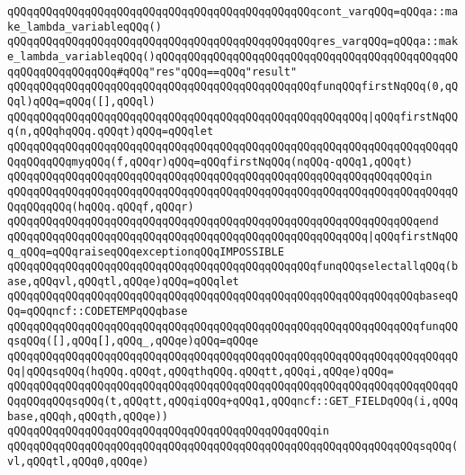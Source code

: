 \verb|qQQqqQQqqQQqqQQqqQQqqQQqqQQqqQQqqQQqqQQqqQQqqQQqcont_varqQQq=qQQqa::make_lambda_variableqQQq()|\newline
\verb|qQQqqQQqqQQqqQQqqQQqqQQqqQQqqQQqqQQqqQQqqQQqqQQqres_varqQQq=qQQqa::make_lambda_variableqQQq()qQQqqQQqqQQqqQQqqQQqqQQqqQQqqQQqqQQqqQQqqQQqqQQqqQQqqQQqqQQqqQQq#qQQq"res"qQQq==qQQq"result"|\newline
\newline
\verb|qQQqqQQqqQQqqQQqqQQqqQQqqQQqqQQqqQQqqQQqqQQqqQQqfunqQQqfirstNqQQq(0,qQQql)qQQq=qQQq([],qQQql)|\newline
\verb|qQQqqQQqqQQqqQQqqQQqqQQqqQQqqQQqqQQqqQQqqQQqqQQqqQQqqQQq|\verb#|qQQqfirstNqQQq(n,qQQqhqQQq.qQQqt)qQQq=qQQqlet#\newline
\verb|qQQqqQQqqQQqqQQqqQQqqQQqqQQqqQQqqQQqqQQqqQQqqQQqqQQqqQQqqQQqqQQqqQQqqQQqqQQqqQQqmyqQQq(f,qQQqr)qQQq=qQQqfirstNqQQq(nqQQq-qQQq1,qQQqt)|\newline
\verb|qQQqqQQqqQQqqQQqqQQqqQQqqQQqqQQqqQQqqQQqqQQqqQQqqQQqqQQqqQQqqQQqin|\newline
\verb|qQQqqQQqqQQqqQQqqQQqqQQqqQQqqQQqqQQqqQQqqQQqqQQqqQQqqQQqqQQqqQQqqQQqqQQqqQQqqQQq(hqQQq.qQQqf,qQQqr)|\newline
\verb|qQQqqQQqqQQqqQQqqQQqqQQqqQQqqQQqqQQqqQQqqQQqqQQqqQQqqQQqqQQqqQQqend|\newline
\verb|qQQqqQQqqQQqqQQqqQQqqQQqqQQqqQQqqQQqqQQqqQQqqQQqqQQqqQQq|\verb#|qQQqfirstNqQQq_qQQq=qQQqraiseqQQqexceptionqQQqIMPOSSIBLE#\newline
\newline
\verb|qQQqqQQqqQQqqQQqqQQqqQQqqQQqqQQqqQQqqQQqqQQqqQQqfunqQQqselectallqQQq(base,qQQqvl,qQQqtl,qQQqe)qQQq=qQQqlet|\newline
\verb|qQQqqQQqqQQqqQQqqQQqqQQqqQQqqQQqqQQqqQQqqQQqqQQqqQQqqQQqqQQqqQQqbaseqQQq=qQQqncf::CODETEMPqQQqbase|\newline
\verb|qQQqqQQqqQQqqQQqqQQqqQQqqQQqqQQqqQQqqQQqqQQqqQQqqQQqqQQqqQQqqQQqfunqQQqsqQQq([],qQQq[],qQQq_,qQQqe)qQQq=qQQqe|\newline
\verb|qQQqqQQqqQQqqQQqqQQqqQQqqQQqqQQqqQQqqQQqqQQqqQQqqQQqqQQqqQQqqQQqqQQqqQQq|\verb#|qQQqsqQQq(hqQQq.qQQqt,qQQqthqQQq.qQQqtt,qQQqi,qQQqe)qQQq=#\newline
\verb|qQQqqQQqqQQqqQQqqQQqqQQqqQQqqQQqqQQqqQQqqQQqqQQqqQQqqQQqqQQqqQQqqQQqqQQqqQQqqQQqsqQQq(t,qQQqtt,qQQqiqQQq+qQQq1,qQQqncf::GET_FIELDqQQq(i,qQQqbase,qQQqh,qQQqth,qQQqe))|\newline
\verb|qQQqqQQqqQQqqQQqqQQqqQQqqQQqqQQqqQQqqQQqqQQqqQQqin|\newline
\verb|qQQqqQQqqQQqqQQqqQQqqQQqqQQqqQQqqQQqqQQqqQQqqQQqqQQqqQQqqQQqqQQqsqQQq(vl,qQQqtl,qQQq0,qQQqe)|\newline
